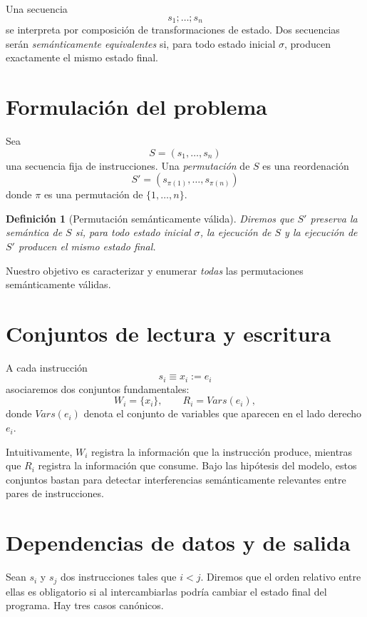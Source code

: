 \documentclass[letterpaper,oneside]{article}
\newtheorem{definition}{Definición}[section]
\theoremstyle{remark}
\newcommand{\Vars}{\mathit{Vars}}
\newcommand{\reads}[1]{R_{#1}}
\newcommand{\writes}[1]{W_{#1}}
\begin{document}
Una secuencia
\[
  s_1;\dots; s_n
\]
se interpreta por composición de transformaciones de estado. Dos secuencias serán \emph{semánticamente equivalentes} si, para todo estado inicial $\sigma$, producen exactamente el mismo estado final.

\section{Formulación del problema}

Sea
\[
  S = (s_1,\dots,s_n)
\]
una secuencia fija de instrucciones. Una \emph{permutación} de $S$ es una reordenación
\[
  S' = (s_{\pi(1)},\dots,s_{\pi(n)})
\]
donde $\pi$ es una permutación de $\{1,\dots,n\}$.

\begin{definition}[Permutación semánticamente válida]
Diremos que $S'$ preserva la semántica de $S$ si, para todo estado inicial $\sigma$, la ejecución de $S$ y la ejecución de $S'$ producen el mismo estado final.
\end{definition}

Nuestro objetivo es caracterizar y enumerar \emph{todas} las permutaciones semánticamente válidas.

\section{Conjuntos de lectura y escritura}

A cada instrucción
\[
  s_i \equiv x_i := e_i
\]
asociaremos dos conjuntos fundamentales:
\[
  \writes{i} = \{x_i\},
  \qquad
  \reads{i} = \Vars(e_i),
\]
donde $\Vars(e_i)$ denota el conjunto de variables que aparecen en el lado derecho $e_i$.

Intuitivamente, $\writes{i}$ registra la información que la instrucción produce, mientras que $\reads{i}$ registra la información que consume. Bajo las hipótesis del modelo, estos conjuntos bastan para detectar interferencias semánticamente relevantes entre pares de instrucciones.

\section{Dependencias de datos y de salida}

Sean $s_i$ y $s_j$ dos instrucciones tales que $i<j$. Diremos que el orden relativo entre ellas es obligatorio si al intercambiarlas podría cambiar el estado final del programa. Hay tres casos canónicos.
\end{document}
